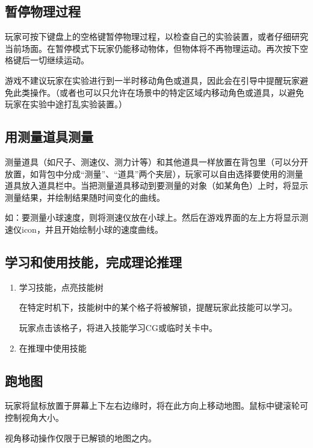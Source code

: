 \documentclass{tstextbook}
\begin{document}
\subsection{暂停物理过程}

玩家可按下键盘上的空格键暂停物理过程，以检查自己的实验装置，或者仔细研究当前场面。在暂停模式下玩家仍能移动物体，但物体将不再物理运动。再次按下空格键后一切继续运动。

游戏不建议玩家在实验进行到一半时移动角色或道具，因此会在引导中提醒玩家避免此类操作。（或者也可以只允许在场景中的特定区域内移动角色或道具，以避免玩家在实验中途打乱实验装置。）

\subsection{用测量道具测量}

测量道具（如尺子、测速仪、测力计等）和其他道具一样放置在背包里（可以分开放置，如背包中分成“测量”、“道具”两个夹层），玩家可以自由选择要使用的测量道具放入道具栏中。当把测量道具移动到要测量的对象（如某角色）上时，将显示测量结果，并绘制结果随时间变化的曲线。

如：要测量小球速度，则将测速仪放在小球上。然后在游戏界面的左上方将显示测速仪icon，并且开始绘制小球的速度曲线。

\subsection{学习和使用技能，完成理论推理}

\begin{enumerate}

\item{学习技能，点亮技能树}

在特定时机下，技能树中的某个格子将被解锁，提醒玩家此技能可以学习。

玩家点击该格子，将进入技能学习CG或临时关卡中。

\item{在推理中使用技能}

\end{enumerate}

\subsection{跑地图}

玩家将鼠标放置于屏幕上下左右边缘时，将在此方向上移动地图。鼠标中键滚轮可控制视角大小。

视角移动操作仅限于已解锁的地图之内。
\end{document}
